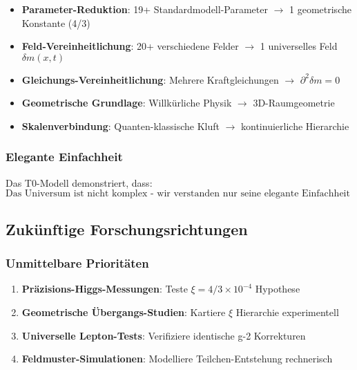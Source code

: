 \documentclass[12pt,a4paper]{article}
\newcommand{\xipar}{\ensuremath{\xi}}
\newcommand{\deltafield}{\ensuremath{\delta m}}
\newcommand{\mytimes}{\ensuremath{\times}}
\newcommand{\myrightarrow}{\ensuremath{\rightarrow}}
\begin{document}
	\begin{tcolorbox}[colback=yellow!10!white,colframe=orange!75!black,title=T0-Theorie Revolutionäre Errungenschaften]
		\begin{itemize}
			\item \textbf{Parameter-Reduktion}: 19+ Standardmodell-Parameter $\myrightarrow$ 1 geometrische Konstante (4/3)
			\item \textbf{Feld-Vereinheitlichung}: 20+ verschiedene Felder $\myrightarrow$ 1 universelles Feld $\deltafield(x,t)$
			\item \textbf{Gleichungs-Vereinheitlichung}: Mehrere Kraftgleichungen $\myrightarrow$ $\partial^2\deltafield = 0$
			\item \textbf{Geometrische Grundlage}: Willkürliche Physik $\myrightarrow$ 3D-Raumgeometrie
			\item \textbf{Skalenverbindung}: Quanten-klassische Kluft $\myrightarrow$ kontinuierliche Hierarchie
		\end{itemize}
	\end{tcolorbox}
	
	\subsubsection{Elegante Einfachheit}
	\label{subsubsec:elegante_einfachheit}
	
	Das T0-Modell demonstriert, dass:
	\begin{equation}
		\boxed{\text{Das Universum ist nicht komplex - wir verstanden nur seine elegante Einfachheit nicht}}
		\label{eq:elegante_wahrheit}
	\end{equation}
	
	\subsection{Zukünftige Forschungsrichtungen}
	\label{subsec:zukuenftige_forschung}
	
	\subsubsection{Unmittelbare Prioritäten}
	\label{subsubsec:unmittelbare_prioritaeten}
	
	\begin{enumerate}
		\item \textbf{Präzisions-Higgs-Messungen}: Teste $\xipar = 4/3 \mytimes 10^{-4}$ Hypothese
		\item \textbf{Geometrische Übergangs-Studien}: Kartiere $\xi$ Hierarchie experimentell
		\item \textbf{Universelle Lepton-Tests}: Verifiziere identische g-2 Korrekturen
		\item \textbf{Feldmuster-Simulationen}: Modelliere Teilchen-Entstehung rechnerisch
	\end{enumerate}
	
\end{document}
